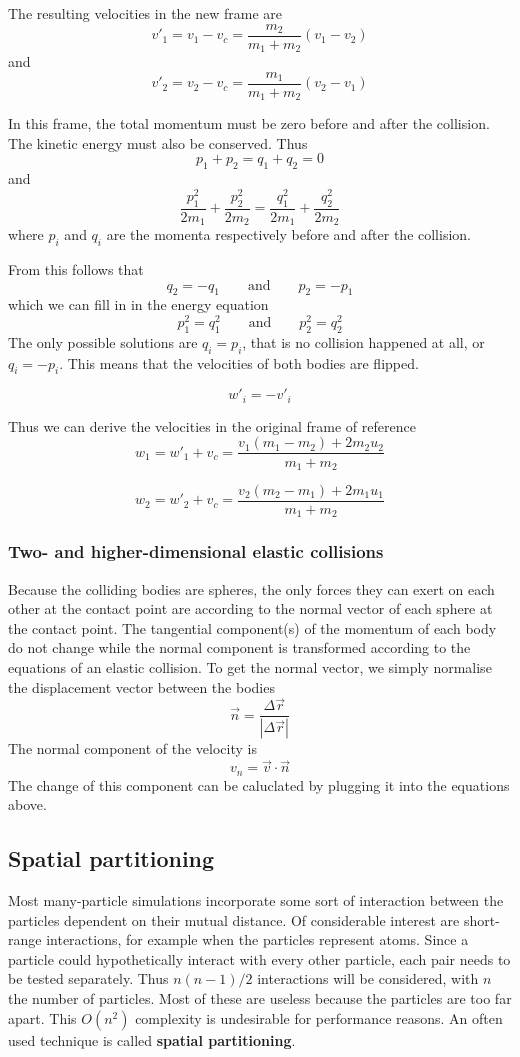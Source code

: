 The resulting velocities in the new frame are
$$
v'_1 = v_1 - v_c = \frac{m_2}{m_1+m_2}(v_1-v_2)
$$
and
$$
v'_2 = v_2 - v_c = \frac{m_1}{m_1+m_2}(v_2-v_1)
$$

In this frame, the total momentum must be zero before and after the collision.  
The kinetic energy must also be conserved.
Thus
$$
p_1 + p_2 = q_1 + q_2 = 0
$$
and
$$
\frac{p_1^2}{2m_1} + \frac{p_2^2}{2m_2} = \frac{q_1^2}{2m_1} + 
\frac{q_2^2}{2m_2}
$$
where $p_i$ and $q_i$ are the momenta respectively before and after the 
collision.

From this follows that
$$
q_2 = -q_1 \qquad \textrm{and} \qquad p_2 = -p_1
$$
which we can fill in in the energy equation
$$
p_1^2 = q_1^2 \qquad \textrm{and} \qquad p_2^2 = q_2^2
$$
The only possible solutions are $q_i = p_i$, that is no collision happened at 
all, or $q_i = -p_i$. This means that the velocities of both bodies are 
flipped.

$$
w'_i = -v'_i
$$

Thus we can derive the velocities in the original frame of reference
$$
w_1 = w'_1 + v_c = \frac{v_1(m_1-m_2) + 2m_2u_2}{m_1+m_2}
$$

$$
w_2 = w'_2 + v_c = \frac{v_2(m_2-m_1) + 2m_1u_1}{m_1+m_2}
$$

\subsubsection{Two- and higher-dimensional elastic collisions}
Because the colliding bodies are spheres, the only forces they can exert on 
each other at the contact point are according to the normal vector of each 
sphere at the contact point. The tangential component(s) of the momentum of 
each body do not change while the normal component is transformed according to 
the equations of an elastic collision. To get the normal vector, we simply 
normalise the displacement vector between the bodies
$$
\vec{n} = \frac{\Delta\vec{r}}{|\Delta\vec{r}|}
$$
The normal component of the velocity is
$$
v_n = \vec{v} \cdot \vec{n}
$$
The change of this component can be caluclated by plugging it into the 
equations above.

\subsection{Spatial partitioning}

Most many-particle simulations incorporate some sort of interaction between the 
particles dependent on their mutual distance. Of considerable interest are 
short-range interactions, for example when the particles represent atoms. Since 
a particle could hypothetically interact with every other particle, each pair 
needs to be tested separately. Thus $n(n-1)/2$ interactions will be considered, 
with $n$ the number of particles. Most of these are useless because the 
particles are too far apart. This $O(n^2)$ complexity is undesirable for 
performance reasons. An often used technique is called \textbf{spatial 
partitioning}.

